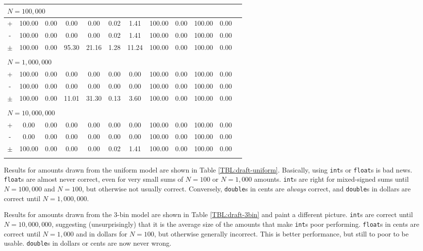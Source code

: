 \documentclass[11pt, oneside]{amsart}   	%
\begin{document}
\begin{table}[ht]
\begin{center}
\begin{tabular}{ c c c c c c c c c c c c }
\\ \multicolumn{11}{l}{$N = 100,000$} \\ \hline
+ 		& 100.00 & 0.00 	& 0.00 & 0.00 		& 0.02 & 1.41 & 100.00 & 0.00 & 100.00 & 0.00 \\
- 		& 100.00 & 0.00 	& 0.00 & 0.00 		& 0.02 & 1.41 & 100.00 & 0.00 & 100.00 & 0.00 \\
$\pm$ 	& 100.00 & 0.00 	& 95.30 & 21.16 	& 1.28 & 11.24 & 100.00 & 0.00 & 100.00 & 0.00 \\
\\ \multicolumn{11}{l}{$N = 1,000,000$} \\ \hline
+ 		& 100.00 & 0.00 	& 0.00 & 0.00 		& 0.00 & 0.00 & 100.00 & 0.00 & 100.00 & 0.00 \\
- 		& 100.00 & 0.00 	& 0.00 & 0.00 		& 0.00 & 0.00 & 100.00 & 0.00 & 100.00 & 0.00 \\
$\pm$ 	& 100.00 & 0.00 	& 11.01 & 31.30 	& 0.13 & 3.60 & 100.00 & 0.00 & 100.00 & 0.00 \\
\\ \multicolumn{11}{l}{$N = 10,000,000$} \\ \hline
+ 		& 0.00 & 0.00 		& 0.00 & 0.00 & 0.00 & 0.00 & 100.00 & 0.00 & 100.00 & 0.00 \\
- 		& 0.00 & 0.00 		& 0.00 & 0.00 & 0.00 & 0.00 & 100.00 & 0.00 & 100.00 & 0.00 \\
$\pm$ 	& 100.00 & 0.00 	& 0.00 & 0.00 & 0.02 & 1.41 & 100.00 & 0.00 & 100.00 & 0.00 \\
\\ \hline
\end{tabular}
\end{center}
\end{table}

Results for amounts drawn from the uniform model are shown in Table \ref{TBL:draft-uniform}. Basically, using \texttt{int}s or \texttt{float}s is bad news. \texttt{float}s are almost never correct, even for very small sums of $N=100$ or $N=1,000$ amounts. \texttt{int}s are right for mixed-signed sums until $N=100,000$ and $N = 100$, but otherwise not usually correct. Conversely, \texttt{double}s in cents are {\em always} correct, and \texttt{double}s in dollars are correct until $N = 1,000,000$. 

Results for amounts drawn from the 3-bin model are shown in Table \ref{TBL:draft-3bin} and paint a different picture. \texttt{int}s are correct until $N=10,000,000$, suggesting (unsurprisingly) that it is the average size of the amounts that make \texttt{int}s poor performing. \texttt{float}s in cents are correct until $N=1,000$ and in dollars for $N=100$, but otherwise generally incorrect. This is better performance, but still to poor to be usable. \texttt{double}s in dollars or cents are now never wrong. 
\end{document}

